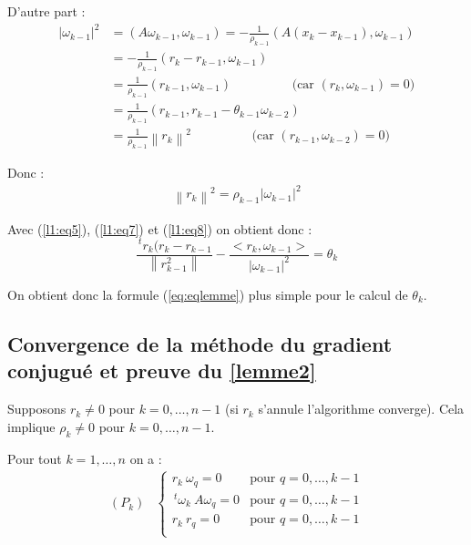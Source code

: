 \documentclass[a4paper,11pt]{article}
\newcommand{\norm}[1]{\left\lVert#1\right\rVert}
\newcommand{\tpo}[1]{\,^t#1}
\theoremstyle{plain} %
\begin{document}
D'autre part :
\begin{align*}
    |\omega_{k-1}|^2 & = (A \omega_{k-1}, \omega_{k-1}) = -\frac{1}{\rho_{k-1}}(A (x_k - x_{k-1}), \omega_{k-1}) \\
    & = -\frac{1}{\rho_{k-1}}(r_k - r_{k-1} , \omega_{k-1}) \\
    & = \frac{1}{\rho_{k-1}}(r_{k-1}, \omega_{k-1}) \hspace{2cm} \text{(car $(r_k,\omega_{k-1}) = 0$)}\\
    & = \frac{1}{\rho_{k-1}}(r_{k-1},r_{k-1}- \theta_{k-1}\omega_{k-2}) \\
    & = \frac{1}{\rho_{k-1}}\norm{r_k}^2 \hspace{2cm} \text{(car $(r_{k-1}, \omega_{k-2}) = 0$)}
\end{align*}

Donc :
\begin{align}
    \norm{r_k}^2 = \rho_{k-1} |\omega_{k-1}|^2
    \label{l1:eq8}
\end{align}

Avec (\ref{l1:eq5}), (\ref{l1:eq7}) et (\ref{l1:eq8}) on obtient donc :
\[
    \frac{\tpo r_k (r_k - r_{k-1}}{\norm{r_{k-1}^2}}  - \frac{<r_k,\omega_{k-1}>}{|\omega_{k-1}|^2} = \theta_k
\]

On obtient donc la formule (\ref{eq:eqlemme}) plus simple pour le calcul de $\theta_k$.

\subsection{Convergence de la méthode du gradient conjugué et preuve du \ref{lemme2}}

Supposons $r_k \ne 0$ pour $k = 0,\dots,n-1$ (si $r_k$ s'annule l'algorithme converge). Cela implique
$\rho_k \ne 0$ pour $k=0,\dots,n-1$.

\begin{lemme}
    Pour tout $k=1,\dots,n$ on a :
    \[
        \begin{array}{cc}
            (P_k) &
            \left\lbrace
            \begin{array}{cc}
                r_k \: \omega_q = 0 & \text{pour $q = 0,\dots,k-1$} \\
                \tpo \omega_k \: A \omega_q = 0 & \text{pour $q = 0,\dots,k-1$} \\
                r_k \: r_q = 0 & \text{pour $q = 0,\dots,k-1$} \\
            \end{array}
            \right.
        \end{array}
    \]
    \label{lemme3}
\end{lemme}
\end{document}
